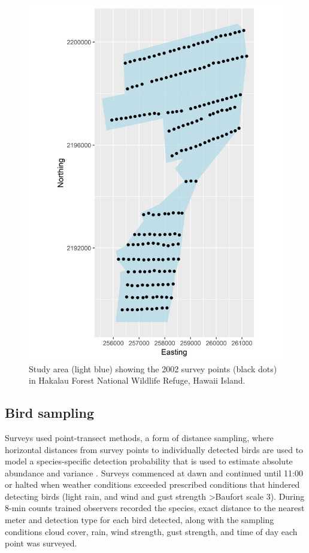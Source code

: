 \documentclass[preprint,12pt]{elsarticle}
\newcommand{\hawaii}{Hawai\textquotesingle i}   %
\begin{document}
\begin{figure}
	\centering
	\includegraphics[scale=0.5]{figures/2002studyareapoints_pt}
	\caption{Study area (light blue) showing the 2002 survey points (black dots) in Hakalau Forest National Wildlife Refuge, \hawaii{} Island.}
	\label{fig:2002studyareapointspt}
\end{figure}

\subsection*{Bird sampling}
Surveys used point-transect methods, a form of distance sampling, where horizontal distances from survey points to individually detected birds are used to model a species-specific detection probability that is used to estimate absolute abundance and variance \citep{buckland_distance_2015}. Surveys commenced at dawn and continued until 11:00 or halted when weather conditions exceeded prescribed conditions that hindered detecting birds (light rain, and wind and gust strength \textgreater Baufort scale 3). During 8-min counts trained observers recorded the species, exact distance to the nearest meter and detection type for each bird detected, along with the sampling conditions cloud cover, rain, wind strength, gust strength, and time of day each point was surveyed.
\end{document}
